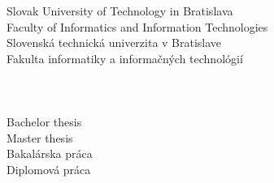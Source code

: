%
\newpage
\begin{center}
\thispagestyle{empty}
{
	{\Large Slovak University of Technology in Bratislava}\textbf{}\\
	{\Large Faculty of Informatics and Information Technologies}\textbf{}\\[\baselineskip]
}
{
	{\Large Slovenská technická univerzita v Bratislave}\textbf{}\\
	{\Large Fakulta informatiky a informačných technológií}\textbf{}\\[\baselineskip]
}
{\large \FIIT}\\
\vspace*{5cm}
{\Large \Author}\textbf{}\\[\baselineskip]
{\huge \Title}\textbf{}\\[\baselineskip]
{
	{
		{\large Bachelor thesis}\\
	}
	{
		{\large Master thesis}\\
	}
}
{
	{
		{\large Bakalárska práca}\\
	}
	{
		{\large Diplomová práca}\\
	}
}
\end{center}
